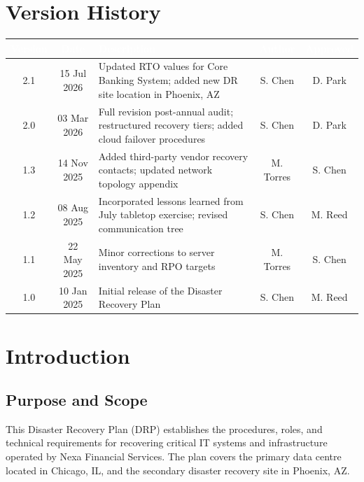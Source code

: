 \documentclass[a4paper,11pt]{article}
\begin{document}
\clearpage

\section{Version History}

\begin{tcolorbox}[colback=lightgray, colframe=primary, boxrule=0.5pt, arc=3pt, left=10pt, right=10pt, top=8pt, bottom=8pt]
\begin{tabularx}{\textwidth}{@{}c c X c c@{}}
  \toprule
  \rowcolor{tablehead}
  \textcolor{white}{\textbf{Version}} & \textcolor{white}{\textbf{Date}} & \textcolor{white}{\textbf{Description}} & \textcolor{white}{\textbf{Author}} & \textcolor{white}{\textbf{Approved}}\\
  \midrule
  \rowcolor{tablerow}
  2.1 & 15 Jul 2026 & Updated RTO values for Core Banking System; added new DR site location in Phoenix, AZ & S. Chen & D. Park\\
  2.0 & 03 Mar 2026 & Full revision post-annual audit; restructured recovery tiers; added cloud failover procedures & S. Chen & D. Park\\
  \rowcolor{tablerow}
  1.3 & 14 Nov 2025 & Added third-party vendor recovery contacts; updated network topology appendix & M. Torres & S. Chen\\
  1.2 & 08 Aug 2025 & Incorporated lessons learned from July tabletop exercise; revised communication tree & S. Chen & M. Reed\\
  \rowcolor{tablerow}
  1.1 & 22 May 2025 & Minor corrections to server inventory and RPO targets & M. Torres & S. Chen\\
  1.0 & 10 Jan 2025 & Initial release of the Disaster Recovery Plan & S. Chen & M. Reed\\
  \bottomrule
\end{tabularx}
\end{tcolorbox}

\section{Introduction}

\subsection{Purpose and Scope}

This Disaster Recovery Plan (DRP) establishes the procedures, roles, and technical requirements for recovering critical IT systems and infrastructure operated by Nexa Financial Services. The plan covers the primary data centre located in Chicago, IL, and the secondary disaster recovery site in Phoenix, AZ.
\end{document}
